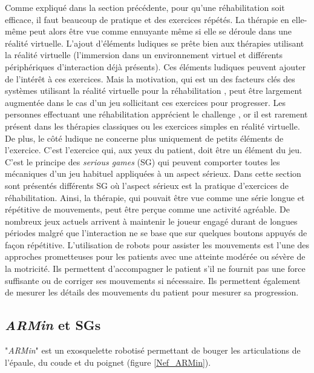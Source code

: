 	\label{sSoaSGNeuroRehab}
	Comme expliqué dans la section précédente, pour qu'une réhabilitation soit efficace, il faut beaucoup de pratique et des exercices répétés. La thérapie en elle-même peut alors être vue comme ennuyante même si elle se déroule dans une réalité virtuelle. L'ajout d'éléments ludiques se prête bien aux thérapies utilisant la réalité virtuelle (l'immersion dans un environnement virtuel et différents périphériques d'interaction déjà présents). Ces éléments ludiques peuvent ajouter de l'intérêt à ces exercices. Mais la motivation, qui est un des facteurs clés des systèmes utilisant la réalité virtuelle pour la réhabilitation \cite{Robertson_AugmentedFeedback}, peut être largement augmentée dans le cas d'un jeu sollicitant ces exercices pour progresser. Les personnes effectuant une réhabilitation apprécient le challenge \cite{Burke_DesigningEngagingPlayableGames4Rehab}, or il est rarement présent dans les thérapies classiques ou les exercices simples en réalité virtuelle. De plus, le côté ludique ne concerne plus uniquement de petits éléments de l'exercice. C'est l'exercice qui, aux yeux du patient, doit être un élément du jeu. C'est le principe des \textit{serious games} (SG) qui peuvent comporter toutes les mécaniques d'un jeu habituel appliquées à un aspect sérieux. Dans cette section sont présentés différents SG où l'aspect sérieux est la pratique d'exercices de réhabilitation. Ainsi, la thérapie, qui pouvait être vue comme une série longue et répétitive de mouvements, peut être perçue comme une activité agréable. De nombreux jeux actuels arrivent à maintenir le joueur engagé durant de longues périodes malgré que l'interaction ne se base que sur quelques boutons appuyés de façon répétitive.
	L'utilisation de robots pour assister les mouvements est l'une des approches prometteuses pour les patients avec une atteinte modérée ou sévère de la motricité. Ils permettent d'accompagner le patient s'il ne fournit pas une force suffisante ou de corriger ses mouvements si nécessaire. Ils permettent également de mesurer les détails des mouvements du patient pour mesurer sa progression.

	\subsection*{\textit{ARMin} et SGs} 
		"\textit{ARMin}" \cite{Nef_ARMinRobot} est un exosquelette robotisé permettant de bouger les articulations de l'épaule, du coude et du poignet (figure \ref{Nef_ARMin}).
		
